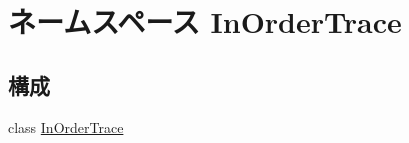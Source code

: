 \hypertarget{namespaceInOrderTrace}{
\section{ネームスペース InOrderTrace}
\label{namespaceInOrderTrace}
}
\subsection*{構成}
\begin{DoxyCompactItemize}
\item 
class \hyperlink{classInOrderTrace_1_1InOrderTrace}{InOrderTrace}
\end{DoxyCompactItemize}
